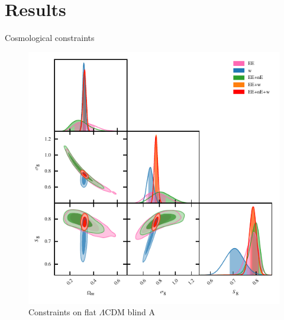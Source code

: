 \section{Results}
\label{sec:results}

Cosmological constraints

\begin{figure}
	\begin{center}
		\includegraphics[width=\columnwidth]{Parameter_Plots/omegam_sigma8_s8_blind_A}
		\caption{Constraints on flat $\Lambda$CDM blind A}
		\label{fig:cosmology-params}
	\end{center}
\end{figure}


